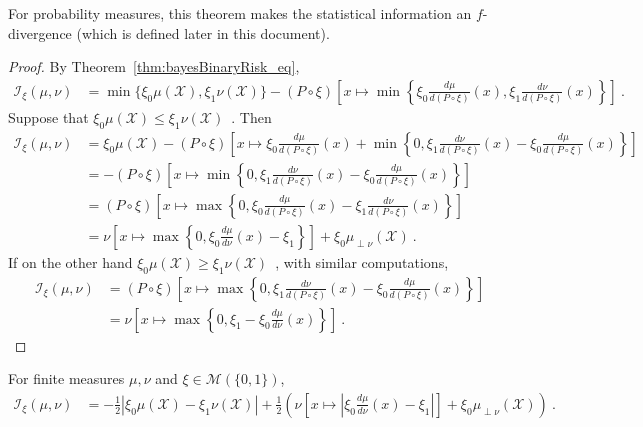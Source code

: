 For probability measures, this theorem makes the statistical information an $f$-divergence (which is defined later in this document).

\begin{proof}\leanok
{}
By Theorem~\ref{thm:bayesBinaryRisk_eq},
\begin{align*}
\mathcal I_\xi(\mu, \nu)
&= \min\{\xi_0\mu(\mathcal X), \xi_1\nu(\mathcal X)\} - (P \circ \xi)\left[x \mapsto \min \left\{\xi_0\frac{d \mu}{d(P \circ \xi)}(x), \xi_1\frac{d \nu}{d(P \circ \xi)}(x)\right\}\right]
\: .
\end{align*}
Suppose that $\xi_0\mu(\mathcal X) \le \xi_1\nu(\mathcal X)$~. Then
\begin{align*}
\mathcal I_\xi(\mu, \nu)
&= \xi_0\mu(\mathcal X) - (P \circ \xi)\left[x \mapsto \xi_0\frac{d \mu}{d(P \circ \xi)}(x) + \min \left\{0 , \xi_1\frac{d \nu}{d(P \circ \xi)}(x) - \xi_0\frac{d \mu}{d(P \circ \xi)}(x)\right\}\right]
\\
&= - (P \circ \xi)\left[x \mapsto \min \left\{0 , \xi_1\frac{d \nu}{d(P \circ \xi)}(x) - \xi_0\frac{d \mu}{d(P \circ \xi)}(x) \right\}\right]
\\
&= (P \circ \xi)\left[x \mapsto \max \left\{0 , \xi_0\frac{d \mu}{d(P \circ \xi)}(x) - \xi_1\frac{d \nu}{d(P \circ \xi)}(x) \right\}\right]
\\
&= \nu\left[ x \mapsto \max \left\{0 , \xi_0\frac{d \mu}{d\nu}(x) - \xi_1 \right\} \right] + \xi_0 \mu_{\perp \nu}(\mathcal X)
\: .
\end{align*}
If on the other hand $\xi_0\mu(\mathcal X) \ge \xi_1\nu(\mathcal X)$~, with similar computations,
\begin{align*}
\mathcal I_\xi(\mu, \nu)
&= (P \circ \xi)\left[x \mapsto \max \left\{0 , \xi_1\frac{d \nu}{d(P \circ \xi)}(x) - \xi_0\frac{d \mu}{d(P \circ \xi)}(x) \right\}\right]
\\
&= \nu\left[ x \mapsto \max \left\{0 , \xi_1 - \xi_0\frac{d \mu}{d\nu}(x) \right\} \right]
\: .
\end{align*}
\end{proof}


\begin{corollary}
  \label{cor:statInfo_eq_integral_abs}
  \leanok
  For finite measures $\mu, \nu$ and $\xi \in \mathcal M(\{0,1\})$,
  \begin{align*}
  \mathcal I_\xi(\mu, \nu)
  &= -\frac{1}{2} \left\vert\xi_0 \mu(\mathcal X) - \xi_1 \nu(\mathcal X)\right\vert + \frac{1}{2}\left( \nu\left[ x \mapsto \left\vert\xi_0\frac{d \mu}{d\nu}(x) - \xi_1 \right\vert \right]  + \xi_0 \mu_{\perp \nu}(\mathcal X)\right)
  \: .
  \end{align*}
\end{corollary}

